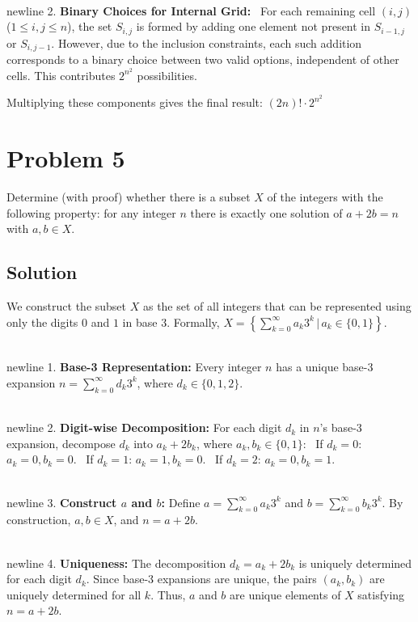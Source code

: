 \documentclass{article}
\begin{document}
\\newline 2. \textbf{Binary Choices for Internal Grid:}
\noindent \textbullet\ For each remaining cell \( (i,j) \) (\( 1 \leq i,j \leq n \)), the set \( S_{i,j} \) is formed by adding one element not present in \( S_{i-1,j} \) or \( S_{i,j-1} \). However, due to the inclusion constraints, each such addition corresponds to a binary choice between two valid options, independent of other cells. This contributes \( 2^{n^2} \) possibilities.

Multiplying these components gives the final result:
\(
\boxed{(2n)! \cdot 2^{n^2}}
\)
\hrulefill
\newpage
\section*{Problem 5}
Determine (with proof) whether there is a subset \(X\) of the integers with the following property: for any integer \(n\) there is exactly one solution of \(a + 2b = n\) with \(a,b \in X\).

\subsection*{Solution}
We construct the subset \( X \) as the set of all integers that can be represented using only the digits \( 0 \) and \( 1 \) in base \( 3 \). Formally, \( X = \left\{ \sum_{k=0}^\infty a_k 3^k \,\big|\, a_k \in \{0,1\} \right\} \). 

\\newline 1. \textbf{Base-3 Representation:} Every integer \( n \) has a unique base-3 expansion \( n = \sum_{k=0}^\infty d_k 3^k \), where \( d_k \in \{0,1,2\} \).

\\newline 2. \textbf{Digit-wise Decomposition:} For each digit \( d_k \) in \( n \)'s base-3 expansion, decompose \( d_k \) into \( a_k + 2b_k \), where \( a_k, b_k \in \{0,1\} \):
\noindent \textbullet\ If \( d_k = 0 \): \( a_k = 0, b_k = 0 \).
\noindent \textbullet\ If \( d_k = 1 \): \( a_k = 1, b_k = 0 \).
\noindent \textbullet\ If \( d_k = 2 \): \( a_k = 0, b_k = 1 \).

\\newline 3. \textbf{Construct \( a \) and \( b \):} Define \( a = \sum_{k=0}^\infty a_k 3^k \) and \( b = \sum_{k=0}^\infty b_k 3^k \). By construction, \( a, b \in X \), and \( n = a + 2b \).

\\newline 4. \textbf{Uniqueness:} The decomposition \( d_k = a_k + 2b_k \) is uniquely determined for each digit \( d_k \). Since base-3 expansions are unique, the pairs \( (a_k, b_k) \) are uniquely determined for all \( k \). Thus, \( a \) and \( b \) are unique elements of \( X \) satisfying \( n = a + 2b \).
\end{document}

